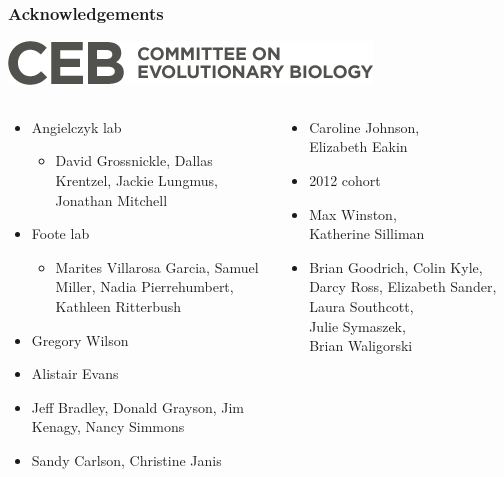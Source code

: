 \documentclass{beamer}
\begin{document}
\begin{frame}
  \frametitle{Acknowledgements}
  \begin{center}
    \includegraphics[width=\textwidth,height=0.1\textheight,keepaspectratio=true]{figure/ceb}
  \end{center}

  \begin{columns}
    \begin{column}{0.35\textwidth}
      \begin{itemize}
        \item \tiny{Angielczyk lab}
          \begin{itemize}
            \item \tiny{David Grossnickle, Dallas Krentzel, Jackie Lungmus, Jonathan Mitchell}
          \end{itemize}
        \item \tiny{Foote lab}
          \begin{itemize}
            \item \tiny{Marites Villarosa Garcia, Samuel Miller, Nadia Pierrehumbert, Kathleen Ritterbush}
          \end{itemize}
        \item \tiny{Gregory Wilson}
        \item \tiny{Alistair Evans}
        \item \tiny{Jeff Bradley, Donald Grayson, Jim Kenagy, Nancy Simmons}
        \item \tiny{Sandy Carlson, Christine Janis}
      \end{itemize}
    \end{column}
    \begin{column}{0.35\textwidth}
      \begin{itemize}
        \item \tiny{Caroline Johnson, \\Elizabeth Eakin}
        \item \tiny{2012 cohort}
        \item \tiny{Max Winston, \\Katherine Silliman}
        \item \tiny{Brian Goodrich, Colin Kyle, Darcy Ross, Elizabeth Sander, Laura Southcott, \\Julie Symaszek, \\Brian Waligorski}

\end{itemize}
\end{column}
\end{columns}
\end{frame}
\end{document}
